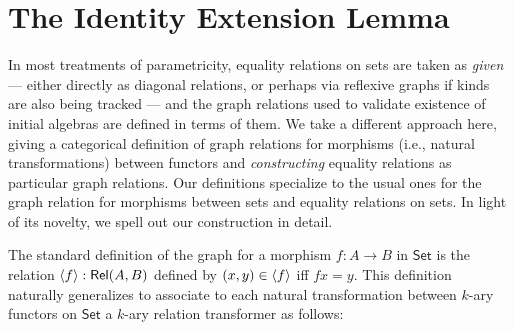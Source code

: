 \documentclass{lmcs}
\theoremstyle{plain}\newtheorem{satz}[thm]{Satz}
\newcommand{\set}{\mathsf{Set}}
\begin{document}
\section{The Identity Extension Lemma}\label{sec:iel}

In most treatments of parametricity, equality relations on sets are
taken as {\em given} --- either directly as diagonal relations, or
perhaps via reflexive graphs if kinds are also being tracked --- and
the graph relations used to validate existence of initial algebras are
defined in terms of them. We take a different approach here, giving a
categorical definition of graph relations for morphisms (i.e., natural
transformations) between functors and {\em constructing} equality
relations as particular graph relations. Our definitions specialize to
the usual ones for the graph relation for morphisms between sets and
equality relations on sets. In light of its novelty, we spell out
our construction in detail.

The standard definition of the graph for a morphism $f : A \to B$ in
$\set$ is the relation $\langle {f} \rangle : \mathsf{Rel}(A,B)$ defined by $(x,y) \in
\langle {f} \rangle$ iff $fx = y$. This definition naturally generalizes to
associate to each natural transformation between $k$-ary functors on
$\set$ a $k$-ary relation transformer as follows:
\end{document}
